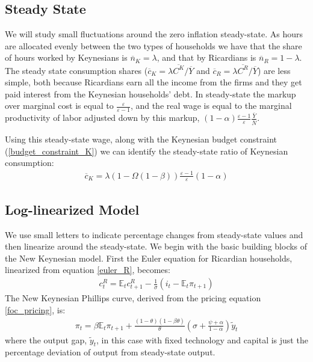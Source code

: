 \documentclass[titlepage]{\econtex}\newcommand{\texname}{ConsumptionHeterogeneity}
\begin{document}
\subsection{Steady State}
We will study small fluctuations around the zero inflation steady-state. As hours are allocated evenly between the two types of households we have that the share of hours worked by Keynesians is $\overline{n}_{K} = \lambda$, and that by Ricardians is $\overline{n}_{R} = 1-\lambda$. The steady state consumption shares ($\overline{c}_{K} = \lambda\overline{C^K}/\overline{Y}$ and $\overline{c}_{R} = \lambda\overline{C^R}/\overline{Y}$) are less simple, both because Ricardians earn all the income from the firms and they get paid interest from the Keynesian households' debt. In steady-state the markup over marginal cost is equal to $\frac{\varepsilon}{\varepsilon-1}$, and the real wage is equal to the marginal productivity of labor adjusted down by this markup, $(1-\alpha) \frac{\varepsilon-1}{\varepsilon}\frac{\overline{Y}}{\overline{N}}$. 

Using this steady-state wage, along with the Keynesian budget constraint (\ref{budget_constraint_K}) we can identify the steady-state ratio of Keynesian consumption:
\begin{align}
\overline{c}_{K} = \lambda \left(1-\Omega(1-\beta)\right)\frac{\varepsilon-1}{\varepsilon}(1-\alpha) \label{c_K_ss}
\end{align}

\subsection{Log-linearized Model}
We use small letters to indicate percentage changes from steady-state values and then linearize around the steady-state. We begin with the basic building blocks of the New Keynesian model. First the Euler equation for Ricardian households, linearized from equation \ref{euler_R}, becomes:
\begin{align}
c^R_t = \mathbb{E}_t c^R_{t+1} - \frac{1}{\sigma}(i_t - \mathbb{E}_t\pi_{t+1}) \label{euler_R_linear}
\end{align}
The New Keynesian Phillips curve, derived from the pricing equation \ref{foc_pricing}, is:
\begin{align}
\pi_t=\beta \mathbb{E}_t\pi_{t+1}+\frac{(1-\theta)(1-\beta\theta)}{\theta}\left(\sigma +  \frac{\psi + \alpha}{1-\alpha} \right)\tilde{y}_t \label{NKphillips_linear}
\end{align}
where the output gap, $\tilde{y}_t$, in this case with fixed technology and capital is just the percentage deviation of output from steady-state output.
\end{document}
